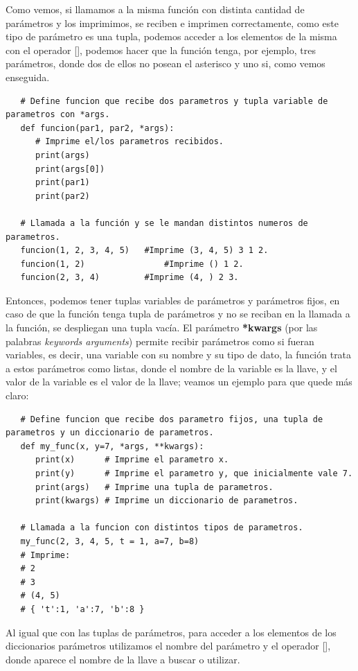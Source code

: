 Como vemos, si llamamos a la misma función con distinta cantidad de parámetros y los imprimimos, se reciben e imprimen correctamente, como este tipo de parámetro es una tupla, podemos acceder a los elementos de la misma con el operador [], podemos hacer que la función tenga, por ejemplo, tres parámetros, donde dos de ellos no posean el asterisco y uno si, como vemos enseguida.
\begin{lstlisting}
   # Define funcion que recibe dos parametros y tupla variable de parametros con *args.
   def funcion(par1, par2, *args):
      # Imprime el/los parametros recibidos.
      print(args)
      print(args[0])
      print(par1)
      print(par2)
   
   # Llamada a la función y se le mandan distintos numeros de parametros.   
   funcion(1, 2, 3, 4, 5)	#Imprime (3, 4, 5) 3 1 2.
   funcion(1, 2)				#Imprime () 1 2.
   funcion(2, 3, 4)			#Imprime (4, ) 2 3.
\end{lstlisting}

Entonces, podemos tener tuplas variables de parámetros y parámetros fijos, en caso de que la función tenga tupla de parámetros y no se reciban en la llamada a la función, se despliegan una tupla vacía. El parámetro \textbf{*kwargs} (por las palabras \textit{keywords arguments}) permite recibir parámetros como si fueran variables, es decir, una variable con su nombre y su tipo de dato, la función trata a estos parámetros como listas, donde el nombre de la variable es la llave, y el valor de la variable es el valor de la llave; veamos un ejemplo para que quede más claro:
\begin{lstlisting}
   # Define funcion que recibe dos parametro fijos, una tupla de parametros y un diccionario de parametros.
   def my_func(x, y=7, *args, **kwargs):
      print(x)		# Imprime el parametro x.
      print(y)		# Imprime el parametro y, que inicialmente vale 7.
      print(args)	# Imprime una tupla de parametros.
      print(kwargs)	# Imprime un diccionario de parametros.

   # Llamada a la funcion con distintos tipos de parametros.
   my_func(2, 3, 4, 5, t = 1, a=7, b=8)
   # Imprime:
   # 2
   # 3
   # (4, 5)
   # { 't':1, 'a':7, 'b':8 }
\end{lstlisting}

Al igual que con las tuplas de parámetros, para acceder a los elementos de los diccionarios parámetros utilizamos el nombre del parámetro y el operador [], donde aparece el nombre de la llave a buscar o utilizar.


